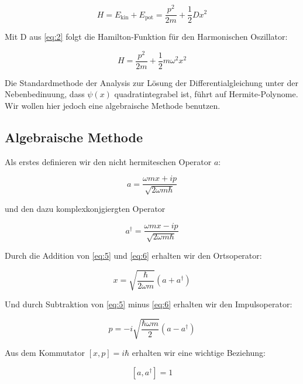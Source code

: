 \begin{equation}
  \label{eq:3}
  H = E_{\text{kin}}+E_{\text{pot}} = \frac{p^2}{2m} + \frac{1}{2}Dx^2
\end{equation}

Mit D aus \eqref{eq:2} folgt die Hamilton-Funktion für den Harmonischen Oszillator:

\begin{equation}
  \label{eq:4}
  \boxed{ H = \frac{p^2}{2m} +  \frac{1}{2}m\omega^2x^2}
\end{equation}


Die Standardmethode der Analysis zur Lösung der Differentialgleichung unter der Nebenbedinuung, dass \(\psi(x)\) quadratintegrabel ist, führt auf Hermite-Polynome. Wir wollen hier jedoch eine algebraische Methode benutzen.

\subsection*{Algebraische Methode}

Als erstes definieren wir den nicht hermiteschen Operator \(a\):

\begin{equation}
  \label{eq:5}
  a = \frac{\omega m x+ip}{\sqrt{2\omega m\hbar}}  
\end{equation}

und den dazu komplexkonjgiergten Operator

\begin{equation}
  \label{eq:6}
  a^\dagger = \frac{\omega m x-ip}{\sqrt{2\omega m\hbar}}
\end{equation}

Durch die Addition von \eqref{eq:5} und  \eqref{eq:6} erhalten wir den Ortsoperator:

\begin{equation}
  \label{eq:7}
  x = \sqrt{\frac{\hbar}{2\omega m}}(a+a^\dagger)
\end{equation}

Und durch Subtraktion von \eqref{eq:5} minus \eqref{eq:6} erhalten wir den Impulsoperator:

\begin{equation}
  \label{eq:8}
  p = -i\sqrt{\frac{\hbar \omega m}{2}}(a-a^\dagger)
\end{equation}

Aus dem Kommutator \([x,p]=i\hbar\) erhalten wir eine wichtige Beziehung:

\begin{equation}
  \label{eq:9}
  \boxed{[a,a^\dagger]=1}
\end{equation}

